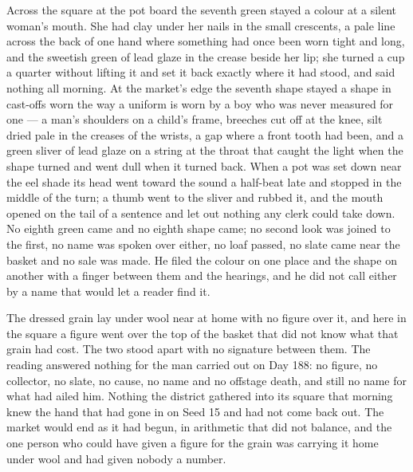 Across the square at the pot board the seventh green stayed a colour at a silent woman's mouth. She had clay under her nails in the small crescents, a pale line across the back of one hand where something had once been worn tight and long, and the sweetish green of lead glaze in the crease beside her lip; she turned a cup a quarter without lifting it and set it back exactly where it had stood, and said nothing all morning. At the market's edge the seventh shape stayed a shape in cast-offs worn the way a uniform is worn by a boy who was never measured for one --- a man's shoulders on a child's frame, breeches cut off at the knee, silt dried pale in the creases of the wrists, a gap where a front tooth had been, and a green sliver of lead glaze on a string at the throat that caught the light when the shape turned and went dull when it turned back. When a pot was set down near the eel shade its head went toward the sound a half-beat late and stopped in the middle of the turn; a thumb went to the sliver and rubbed it, and the mouth opened on the tail of a sentence and let out nothing any clerk could take down. No eighth green came and no eighth shape came; no second look was joined to the first, no name was spoken over either, no loaf passed, no slate came near the basket and no sale was made. He filed the colour on one place and the shape on another with a finger between them and the hearings, and he did not call either by a name that would let a reader find it.

The dressed grain lay under wool near  at home with no figure over it, and here in the square a figure went over the top of the basket that did not know what that grain had cost. The two stood apart with no signature between them. The reading answered nothing for the man carried out on Day 188: no figure, no collector, no slate, no cause, no name and no offstage death, and still no name for what had ailed him. Nothing the district gathered into its square that morning knew the hand that had gone in on Seed 15 and had not come back out. The market would end as it had begun, in arithmetic that did not balance, and the one person who could have given a figure for the grain was carrying it home under wool and had given nobody a number.

\scenebreak

